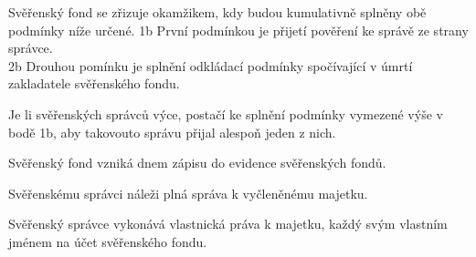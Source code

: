 \documentclass[parskip=half]{scrreprt}
\begin{document}
\begin{contract}


Svěřenský fond se zřizuje okamžikem, kdy budou kumulativně splněny obě podmínky níže určené.
1b První podmínkou je přijetí pověření ke správě ze strany správce.\\
2b Drouhou pomínku je splnění odkládací podmínky spočívající v úmrtí zakladatele svěřenského fondu.


Je li svěřenských správců výce, postačí ke splnění podmínky vymezené výše v bodě 1b, aby takovouto správu přijal alespoň jeden z nich.



Svěřenský fond vzniká dnem zápisu do evidence svěřenských fondů.




Svěřenskému správci náleži plná správa k vyčleněnému majetku.

Svěřenský správce vykonává vlastnická práva k majetku, každý svým vlastním jménem na účet svěřenského fondu.




\end{contract}
\end{document}
